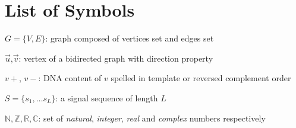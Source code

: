 \chapter{List of Symbols}

\begin{list}{}{%
\setlength{\labelwidth}{24mm}
\setlength{\leftmargin}{34mm}}
\item[$G=\{V,E\}$:] graph composed of vertices set and edges set
\item[$\overrightarrow{u}$,$\overrightarrow{v}$:] vertex of a bidirected graph with direction property
\item[$v+$, $v-$:] DNA content of $v$ spelled in template or reversed complement order
\item[$S=\{s_1, \ldots s_L\}$:] a signal sequence of length $L$
\item[$\mathbb{N}, \mathbb{Z}, \mathbb{R}, \mathbb{C}$:] set of \emph{natural}, \emph{integer}, \emph{real} and \emph{complex} numbers respectively
\end{list}
